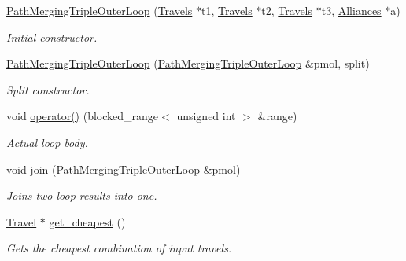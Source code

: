 \begin{DoxyCompactItemize}
\item 
\hyperlink{classoma_1_1_path_merging_triple_outer_loop_ae0e2135ae638def58874c13fa213cc7c}{Path\-Merging\-Triple\-Outer\-Loop} (\hyperlink{types_8h_aef021ba284c03a12dddcfa082468e831}{Travels} $\ast$t1, \hyperlink{types_8h_aef021ba284c03a12dddcfa082468e831}{Travels} $\ast$t2, \hyperlink{types_8h_aef021ba284c03a12dddcfa082468e831}{Travels} $\ast$t3, \hyperlink{types_8h_a942cbcc40778424afe78605ae5c364c0}{Alliances} $\ast$a)
\begin{DoxyCompactList}\small\item\em Initial constructor. \end{DoxyCompactList}\item 
\hyperlink{classoma_1_1_path_merging_triple_outer_loop_a89f7155d02bd7a3eb031aa3eae79a32f}{Path\-Merging\-Triple\-Outer\-Loop} (\hyperlink{classoma_1_1_path_merging_triple_outer_loop}{Path\-Merging\-Triple\-Outer\-Loop} \&pmol, split)
\begin{DoxyCompactList}\small\item\em Split constructor. \end{DoxyCompactList}\item 
void \hyperlink{classoma_1_1_path_merging_triple_outer_loop_afa23a4978c76070770d4da939a12f673}{operator()} (blocked\-\_\-range$<$ unsigned int $>$ \&range)
\begin{DoxyCompactList}\small\item\em Actual loop body. \end{DoxyCompactList}\item 
void \hyperlink{classoma_1_1_path_merging_triple_outer_loop_a487382f940283b62f82b10f87f290d86}{join} (\hyperlink{classoma_1_1_path_merging_triple_outer_loop}{Path\-Merging\-Triple\-Outer\-Loop} \&pmol)
\begin{DoxyCompactList}\small\item\em Joins two loop results into one. \end{DoxyCompactList}\item 
\hyperlink{class_travel}{Travel} $\ast$ \hyperlink{classoma_1_1_path_merging_triple_outer_loop_a98c5fc77dd1080927d366d68b044cb47}{get\-\_\-cheapest} ()
\begin{DoxyCompactList}\small\item\em Gets the cheapest combination of input travels. \end{DoxyCompactList}\end{DoxyCompactItemize}
